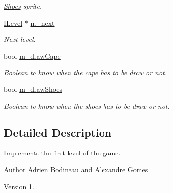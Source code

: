 \begin{DoxyCompactItemize}
\begin{DoxyCompactList}\small\item\em \hyperlink{class_shoes}{Shoes} sprite. \end{DoxyCompactList}\item 
\hypertarget{class_level_one_a0c7f3a7cd9a2e9a0aa1fcebfac254ab7}{\hyperlink{class_i_level}{I\-Level} $\ast$ \hyperlink{class_level_one_a0c7f3a7cd9a2e9a0aa1fcebfac254ab7}{m\-\_\-next}}\label{class_level_one_a0c7f3a7cd9a2e9a0aa1fcebfac254ab7}

\begin{DoxyCompactList}\small\item\em Next level. \end{DoxyCompactList}\item 
\hypertarget{class_level_one_a36db6c0a6cb989409632690179fdce3c}{bool \hyperlink{class_level_one_a36db6c0a6cb989409632690179fdce3c}{m\-\_\-draw\-Cape}}\label{class_level_one_a36db6c0a6cb989409632690179fdce3c}

\begin{DoxyCompactList}\small\item\em Boolean to know when the cape has to be draw or not. \end{DoxyCompactList}\item 
\hypertarget{class_level_one_a5d74d0b80f8a7ad29ae2c50f839d4872}{bool \hyperlink{class_level_one_a5d74d0b80f8a7ad29ae2c50f839d4872}{m\-\_\-draw\-Shoes}}\label{class_level_one_a5d74d0b80f8a7ad29ae2c50f839d4872}

\begin{DoxyCompactList}\small\item\em Boolean to know when the shoes has to be draw or not. \end{DoxyCompactList}\end{DoxyCompactItemize}


\subsection{Detailed Description}
Implements the first level of the game. 

\begin{DoxyAuthor}{Author}
Adrien Bodineau and Alexandre Gomes 
\end{DoxyAuthor}
\begin{DoxyVersion}{Version}
1. 
\end{DoxyVersion}


